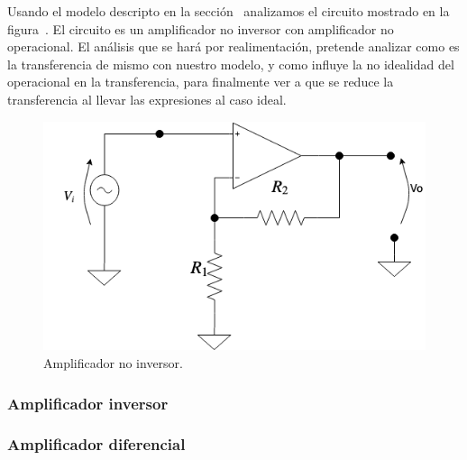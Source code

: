 Usando el modelo descripto en la sección~ analizamos el circuito mostrado en la figura~. El circuito es un amplificador no inversor con amplificador no operacional. El análisis que se hará por realimentación, pretende analizar como es la transferencia de mismo con nuestro modelo, y como influye la no idealidad del operacional en la transferencia, para finalmente ver a que se reduce la transferencia al llevar las expresiones al caso ideal.

\begin{figure}[H] %
\begin{center}
\includegraphics[width=0.5 \textwidth, angle=0]{./img/operacionales/OP_NINV.png}
\caption{\label{fig:fig_operational_ideal_non_inverter}\footnotesize{Amplificador no inversor.}}
\end{center}
\end{figure}




\subsubsection{Amplificador inversor}


\subsubsection{Amplificador diferencial}